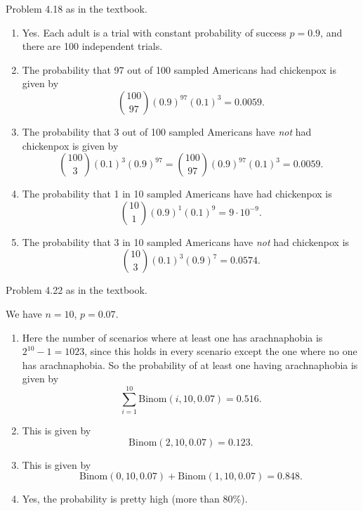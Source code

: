 \begin{prob}
    Problem 4.18 as in the textbook.
\end{prob}
\begin{solution}
    \begin{enumerate}[label=(\alph*)]
    \setlength\itemsep{-.2em}
        \item Yes. Each adult is a trial with constant probability of success $p=0.9$, and there are 100 independent trials. 
        \item  The probability that 97 out of 100 sampled Americans had chickenpox is given by \[
                {100\choose 97} (0.9)^{97}(0.1)^3=0.0059.
        \] 
    \item The probability that 3 out of 100 sampled Americans have \emph{not} had chickenpox is given by \[
            {100 \choose 3} (0.1)^3(0.9)^{97}={100\choose 97} (0.9)^{97}(0.1)^3=0.0059.
    \] 
\item The probability that 1 in 10 sampled Americans have had chickenpox is \[
        {10 \choose 1} (0.9)^1(0.1)^{9}=9\cdot 10^{-9}.
    \] 
\item The probability that 3 in 10 sampled Americans have \emph{not} had chickenpox is \[
        {10 \choose 3} (0.1)^{3}(0.9)^{7}=0.0574.
\] 
    \end{enumerate}
\end{solution}

\begin{prob}
    Problem 4.22 as in the textbook.
\end{prob}
\begin{solution}
     We have $n=10$,  $p=0.07$.
     \begin{enumerate}[label=(\alph*)]
     \setlength\itemsep{-.2em}
\item  Here the number of scenarios where at least one has arachnaphobia is $2 ^{10}-1=1023$, since this holds in every scenario except the one where no one has arachnaphobia. So the probability of at least one having arachnaphobia is given by \[
        \sum _{i=1}^{10}\mathrm{Binom}(i, 10, 0.07)=0.516.
\] 
\item This is given by \[
        \mathrm{Binom}(2, 10, 0.07)=0.123.
\] 
\item This is given by \[
        \mathrm{Binom}(0, 10, 0.07)+\mathrm{Binom}(1, 10, 0.07)=0.848.
\] 
\item Yes, the probability is pretty high (more than 80\%).
     \end{enumerate}
\end{solution}

